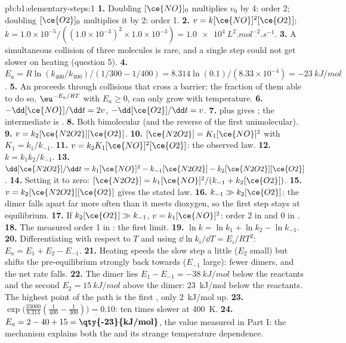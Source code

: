 \begin{solution}{pb:b1:elementary-steps:1}
\textbf{1.} Doubling $[\ce{NO}]_0$ multiplies $v_0$ by 4: order 2; doubling
$[\ce{O2}]_0$ multiplies it by 2: order 1.
\textbf{2.} $v = k[\ce{NO}]^2[\ce{O2}]$; $k = 1.0 \times 10^{-5}/((1.0
\times 10^{-3})^2 \times 1.0 \times 10^{-3}) =
\qty{1.0e4}{L^2.mol^{-2}.s^{-1}}$.
\textbf{3.} A simultaneous collision of three molecules is rare, and a
single step could not get slower on heating (question 5).
\textbf{4.} $E_a = R\ln(k_{400}/k_{300})/(1/300 - 1/400) = 8.314 \ln(0.1)
/(8.33 \times 10^{-4}) = \qty{-23}{kJ/mol}$.
\textbf{5.} An  proceeds through collisions that cross a
barrier; the fraction of them able to do so, $\eu^{-E_a/RT}$ with $E_a \ge
0$, can only grow with temperature.
\textbf{6.} $-\dd[\ce{NO}]/\dd t = 2v$, $-\dd[\ce{O2}]/\dd t = v$.
\textbf{7.}  plus  gives
; the intermediate is .
\textbf{8.} Both bimolecular (and the reverse of the first unimolecular).
\textbf{9.} $v = k_2[\ce{N2O2}][\ce{O2}]$.
\textbf{10.} $[\ce{N2O2}] = K_1[\ce{NO}]^2$ with $K_1 = k_1/k_{-1}$.
\textbf{11.} $v = k_2K_1[\ce{NO}]^2[\ce{O2}]$: the observed law.
\textbf{12.} $k = k_1k_2/k_{-1}$.
\textbf{13.} $\dd[\ce{N2O2}]/\dd t = k_1[\ce{NO}]^2 - k_{-1}[\ce{N2O2}] -
k_2[\ce{N2O2}][\ce{O2}]$.
\textbf{14.} Setting it to zero: $[\ce{N2O2}] = k_1[\ce{NO}]^2/(k_{-1} +
k_2[\ce{O2}])$.
\textbf{15.} $v = k_2[\ce{N2O2}][\ce{O2}]$ gives the stated law.
\textbf{16.} $k_{-1} \gg k_2[\ce{O2}]$: the dimer falls apart far more often
than it meets dioxygen, so the first step stays at equilibrium.
\textbf{17.} If $k_2[\ce{O2}] \gg k_{-1}$, $v = k_1[\ce{NO}]^2$: order 2 in
 and 0 in .
\textbf{18.} The measured order 1 in : the first limit.
\textbf{19.} $\ln k = \ln k_1 + \ln k_2 - \ln k_{-1}$.
\textbf{20.} Differentiating with respect to $T$ and using $\dd\ln k_i/\dd T
= E_i/RT^2$: $E_a = E_1 + E_2 - E_{-1}$.
\textbf{21.} Heating speeds the slow step a little ($E_2$ small) but shifts
the pre-equilibrium strongly back towards  ($E_{-1}$ large): fewer
dimers, and the net rate falls.
\textbf{22.} The dimer lies $E_1 - E_{-1} = \qty{-38}{kJ/mol}$ below the
reactants and the second  $E_2 = \qty{15}{kJ/mol}$ above
the dimer: \qty{23}{kJ/mol} below the reactants. The highest point of the
path is the first , only \qty{2}{kJ/mol} up.
\textbf{23.} $\exp\big(\frac{23000}{8.314}(\frac{1}{400} - \frac{1}{300})\big)
= 0.10$: ten times slower at \qty{400}{K}.
\textbf{24.} $E_a = 2 - 40 + 15 = \textbf{\qty{-23}{kJ/mol}}$, the value
measured in Part I: the mechanism explains both the  and its
strange temperature dependence.
\end{solution}

